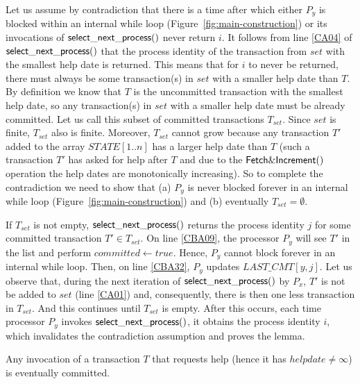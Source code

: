 \begin{proofL}
Let us assume by contradiction that there is a time after which
either $P_y$ is blocked within an internal while loop 
(Figure~\ref{fig:main-construction})  or its
invocations of ${\sf select\_next\_process}()$   never  return $i$. 
It follows from line \ref{CA04} of ${\sf  select\_next\_process}()$  that
the process identity  of the transaction from $set$  with the smallest help
date is returned. 
This means  that for $i$  to never be  returned, there must always  be some 
transaction(s) in $set$ with a smaller help date than $T$. 
By  definition we know  that $T$  is the  uncommitted transaction  with the
smallest help date, so any transaction(s) in $set$ with a smaller help date
must be  already committed. 
Let us call  this subset of committed  transactions  $T_{set}$. 
Since $set$ is finite, $T_{set}$ also is  finite.  
Moreover,   $T_{set}$ cannot grow because any  transaction $T'$ added to
the array $\mathit{STATE}[1..n]$ has  a larger help date than $T$
(such a transaction $T'$ has  asked for help after $T$
and  due to the  ${\sf Fetch\&Increment}()$  operation the  help  dates 
are  monotonically increasing).  
So  to complete  the contradiction  we  need to  show that 
(a) $P_y$  is never blocked forever in an internal while loop 
(Figure~\ref{fig:main-construction})
and (b) eventually $T_{set} = \emptyset$. 

If $T_{set}$  is not empty, ${\sf  select\_next\_process}()$  returns
the process identity $j$ for some committed transaction $T'\in T_{set}$. 
On line  \ref{CBA09}, the processor 
$P_y$ will see $T'$  in the list and perform $committed \gets true$. 
Hence, $P_y$ cannot block forever in an internal while loop. 
Then, on line \ref{CBA32}, $P_y$  updates  $\mathit{LAST\_CMT}[y,j]$.
Let  us   observe  that,  during  the   next   iteration   of  
${\sf select\_next\_process}()$ by $P_x$,  $T'$ is not be added to  $set$ 
(line  \ref{CA01}) and, consequently, 
there is then  one less  transaction in $T_{set}$. And this
continues until $T_{set}$ is empty.  After this occurs,   
each time processor $P_y$ invokes ${\sf  select\_next\_process}()$,  it
obtains the process identity $i$, which invalidates the contradiction 
assumption and proves the lemma. 
\renewcommand{\toto}{lemma:help-commit-1}
\end{proofL}


\begin{lemma}
\label{lemma:helped-transaction}
Any invocation of a transaction $T$ that requests help 
(hence it has $helpdate \neq \infty$) is eventually committed.
\end{lemma}

